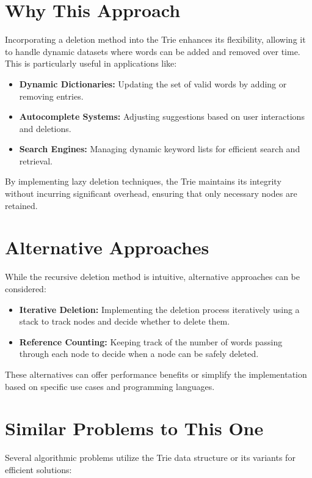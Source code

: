 \section*{Why This Approach}

Incorporating a deletion method into the Trie enhances its flexibility, allowing it to handle dynamic datasets where words can be added and removed over time. This is particularly useful in applications like:

\begin{itemize}
    \item \textbf{Dynamic Dictionaries:} Updating the set of valid words by adding or removing entries.
    \item \textbf{Autocomplete Systems:} Adjusting suggestions based on user interactions and deletions.
    \item \textbf{Search Engines:} Managing dynamic keyword lists for efficient search and retrieval.
\end{itemize}

By implementing lazy deletion techniques, the Trie maintains its integrity without incurring significant overhead, ensuring that only necessary nodes are retained.

\section*{Alternative Approaches}

While the recursive deletion method is intuitive, alternative approaches can be considered:

\begin{itemize}
    \item \textbf{Iterative Deletion:} Implementing the deletion process iteratively using a stack to track nodes and decide whether to delete them.
    \item \textbf{Reference Counting:} Keeping track of the number of words passing through each node to decide when a node can be safely deleted.
\end{itemize}

These alternatives can offer performance benefits or simplify the implementation based on specific use cases and programming languages.

\section*{Similar Problems to This One}

Several algorithmic problems utilize the Trie data structure or its variants for efficient solutions:

